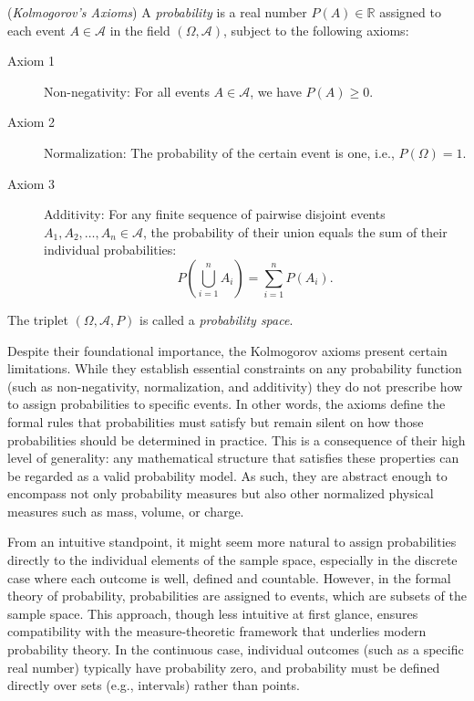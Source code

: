 \begin{definition} (\emph{Kolmogorov's Axioms})\label{Kolmogorov_axioms}
A \emph{probability} is a real number $P(A) \in \mathbb{R}$ assigned to each event $A \in \mathcal{A}$ in the field $\left( \Omega, \mathcal{A} \right)$, subject to the following axioms:

\medskip

\begin{description}
\item [Axiom 1] Non-negativity: For all events $A \in \mathcal{A}$, we have $P(A) \geq 0$.
\item [Axiom 2] Normalization: The probability of the certain event is one, i.e., $P(\Omega) = 1$.
\item [Axiom 3] Additivity: For any finite sequence of pairwise disjoint events $A_1, A_2, \ldots, A_n \in \mathcal{A}$, the probability of their union equals the sum of their individual probabilities:
\[
P\left(\bigcup_{i=1}^n A_i\right) = \sum_{i=1}^n P(A_i).
\]
\end{description}

The triplet $\left( \Omega, \mathcal{A}, P \right)$ is called a \emph{probability space}.
\end{definition}

Despite their foundational importance, the Kolmogorov axioms present certain limitations. While they establish essential constraints on any probability function (such as non-negativity, normalization, and additivity) they do not prescribe how to assign probabilities to specific events. In other words, the axioms define the formal rules that probabilities must satisfy but remain silent on how those probabilities should be determined in practice. This is a consequence of their high level of generality: any mathematical structure that satisfies these properties can be regarded as a valid probability model. As such, they are abstract enough to encompass not only probability measures but also other normalized physical measures such as mass, volume, or charge.

From an intuitive standpoint, it might seem more natural to assign probabilities directly to the individual elements of the sample space, especially in the discrete case where each outcome is well, defined and countable. However, in the formal theory of probability, probabilities are assigned to events, which are subsets of the sample space. This approach, though less intuitive at first glance, ensures compatibility with the measure-theoretic framework that underlies modern probability theory. In the continuous case, individual outcomes (such as a specific real number) typically have probability zero, and probability must be defined directly over sets (e.g., intervals) rather than points.

